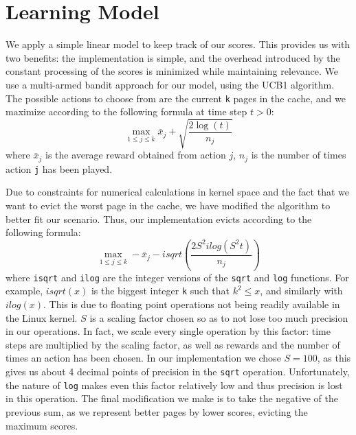 \section{Learning Model} \label{section:learning}

We apply a simple linear model to keep track of our scores. This provides us with two benefits: the implementation is simple, and the overhead introduced by the constant processing of the scores is minimized while maintaining relevance. We use a multi-armed bandit approach for our model, using the UCB1 algorithm. The possible actions to choose from are the current \texttt{k} pages in the cache, and we maximize according to the following formula at time step $t>0$: $$\max_{1 \leq j \leq k} \bar{x}_{j} + \sqrt{\frac{2\log(t)}{n_{j}}}$$  where $\bar{x}_{j}$ is the average reward obtained from action $j$, $n_{j}$ is the number of times action \texttt{j} has been played.

Due to constraints for numerical calculations in kernel space and the fact that we want to evict the worst page in the cache, we have modified the algorithm to better fit our scenario. Thus, our implementation evicts according to the following formula:  $$\max_{1 \leq j \leq k} -\bar{x}_{j} - isqrt(\frac{2S^{2}ilog(S^{2}t)}{n_{j}})$$ where \texttt{isqrt} and \texttt{ilog} are the integer versions of the \texttt{sqrt} and \texttt{log} functions. For example, $isqrt(x)$ is the biggest integer \texttt{k} such that $k^{2}\leq x$, and similarly with $ilog(x)$. This is due to floating point operations not being readily available in the Linux kernel. $S$ is a scaling factor chosen so as to not lose too much precision in our operations. In fact, we scale every single operation by this factor: time steps are multiplied by the scaling factor, as well as rewards and the number of times an action has been chosen. In our implementation we chose $S=100$, as this gives us about 4 decimal points of precision in the \texttt{sqrt} operation. Unfortunately, the nature of \texttt{log} makes even this factor relatively low and thus precision is lost in this operation. The final modification we make is to take the negative of the previous sum, as we represent better pages by lower scores, evicting the maximum scores.
